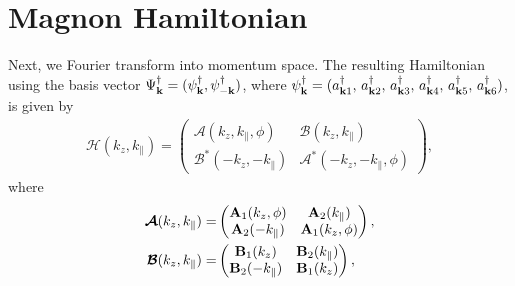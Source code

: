 \documentclass[aps,twocolumn,amsmath,amssymb, superscriptaddress]{revtex4}
\def\dg{\dagger}
\def\bo{\bold{k}}
\begin{document}
 
\section{Magnon Hamiltonian}

Next, we Fourier transform into momentum space. The resulting  Hamiltonian 
using the  basis vector $\Psi^\dg_\bo=(\psi^\dg_\bo,\psi^\dg_{-\bo})$, where $\psi^\dg_\bo=(a_{\bo 1}^{\dg},\thinspace a_{\bo 2}^{\dg},\thinspace a_{\bo 3}^{\dg}, \thinspace a_{\bo 4}^{\dg},\thinspace a_{\bo 5}^{\dg},\thinspace a_{\bo 6}^{\dg} )$, is given by 
\begin{align}
\boldsymbol{\mathcal{H}}(k_z,k_\parallel)= 
\begin{pmatrix}
\boldsymbol{\mathcal{A}}(k_z,k_\parallel, \phi) & \boldsymbol{\mathcal{B}}(k_z,k_\parallel)\\
\boldsymbol{\mathcal{B}}^*(-k_z,-k_\parallel)&\boldsymbol{\mathcal{A}}^*(-k_z,-k_\parallel,\phi)
\end{pmatrix},
\label{ham}
\end{align}
where 
\begin{align}
\boldsymbol{\mathcal{A}}(k_z,k_\parallel)= &
\begin{pmatrix}
\bold{A}_1(k_z,\phi) & \bold{A}_2(k_\parallel)\\
\bold{A}_2(-k_\parallel)&\bold{A}_1(k_z,\phi)
\end{pmatrix},\\
\boldsymbol{\mathcal{B}}(k_z,k_\parallel)= &
\begin{pmatrix}
\bold{B}_1(k_z) & \bold{B}_2(k_\parallel)\\
\bold{B}_2(-k_\parallel)& \bold{B}_1(k_z)
\end{pmatrix},
\end{align}
 
\end{document}
